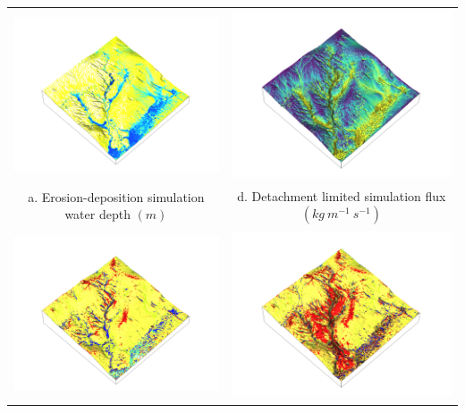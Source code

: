 \documentclass{standalone}
\begin{document}
\scriptsize
\centering 


\begin{tabular}{m{} m{}}
% 
\multicolumn{1}{c}{\includegraphics[height=50mm]{../../images/ss_erdep_3d/depth_2016_01_01_02_00_00.png}} %
& \multicolumn{1}{c}{\includegraphics[height=50mm]{../../images/ss_flux_3d/flux_2016_01_01_02_00_00.png}}\\
\multicolumn{1}{c}{a. Erosion-deposition simulation water depth $(m)$} 
& \multicolumn{1}{c}{d. Detachment limited simulation flux $(kg~m^{-1}~s^{-1})$}\\
%
\multicolumn{1}{c}{\includegraphics[height=50mm]{../../images/ss_erdep_3d/landforms.png}} &
\multicolumn{1}{c}{\includegraphics[height=50mm]{../../images/ss_flux_3d/landforms.png}}\\

\end{tabular}
\end{document}
